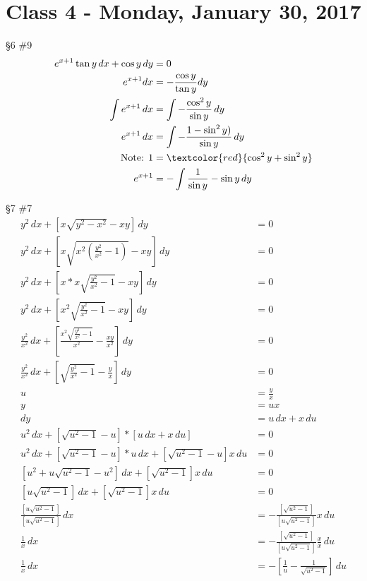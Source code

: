 \chapter{Class 4 - Monday, January 30, 2017}
\begin{hwk}
\S6 $\#$9\\
\begin{align*}
    e^{x+1}\tan y \,dx+\cos y \,dy&=0\\
    e^{x+1}dx &= -\frac{\cos y}{\tan y}dy\\
    \int e^{x+1} \,dx &= \int - \frac{\cos^2 y}{\sin y} \,dy\\
    e^{x+1} \,dx &= \int - \frac{1-\sin^2 y)}{\sin y} \,dy\\
    \text{Note: }1 &= \textcolor{red}{\cos^2 y+\sin^2 y}\\
    e^{x+1}&=- \int\frac{1}{\sin y} - \sin y \,dy\\
\end{align*}
\end{hwk}
\begin{hwk}
\S7 $\#$7\\
\begin{align*}
    y^2 \,dx +\left[x \sqrt{y^2-x^2}-xy \right] \,dy &=0\\
    y^2 \,dx +\left[x \sqrt{x^2\left( \frac{y^2}{x^2}-1\right) }-xy \right] \,dy &=0\\
    y^2 \,dx +\left[x*x \sqrt{\frac{y^2}{x^2}-1}-xy \right] \,dy &=0\\
   y^2 \,dx +\left[x^2 \sqrt{\frac{y^2}{x^2}-1}-xy \right] \,dy &=0\\
  \frac{y^2}{x^2} \,dx +\left[\frac{x^2 \sqrt{\frac{y^2}{x^2}-1}}{x^2}-\frac{xy}{x^2} \right] \,dy &=0\\
  \frac{y^2}{x^2} \,dx +\left[\sqrt{\frac{y^2}{x^2}-1}-\frac{y}{x} \right] \,dy &=0\\
  u&= \frac{y}{x}\\
  y&= ux\\
  dy&= u\,dx+x\,du\\
  u^2 \,dx +\left[ \sqrt{u^2-1} -u \right] *\left[ u\,dx +x\,du \right] &=0\\
  u^2 \,dx +\left[ \sqrt{u^2-1} -u \right] *u\,dx + \left[ \sqrt{u^2-1} -u \right] x\,du &=0\\
  \left[ u^2+u\sqrt{u^2-1}-u^2\right]\,dx + \left[\sqrt{u^2-1}\right]x\,du &=0\\
  \left[u\sqrt{u^2-1}\right]\,dx + \left[\sqrt{u^2-1}\right]x\,du &=0\\
  \frac{\left[u\sqrt{u^2-1}\right]}{\left[u\sqrt{u^2-1}\right]}\,dx &= -\frac{\left[\sqrt{u^2-1}\right]}{\left[u\sqrt{u^2-1}\right]}x\,du\\
  \frac{1}{x}\,dx &= -\frac{\left[\sqrt{u^2-1}\right]}{\left[u\sqrt{u^2-1}\right]}\frac{x}{x}\,du\\
  \frac{1}{x}\,dx &= -\left[ \frac{1}{u} - \frac{1}{\sqrt{u^2-1}} \right] \,du
\end{align*}
\end{hwk}
